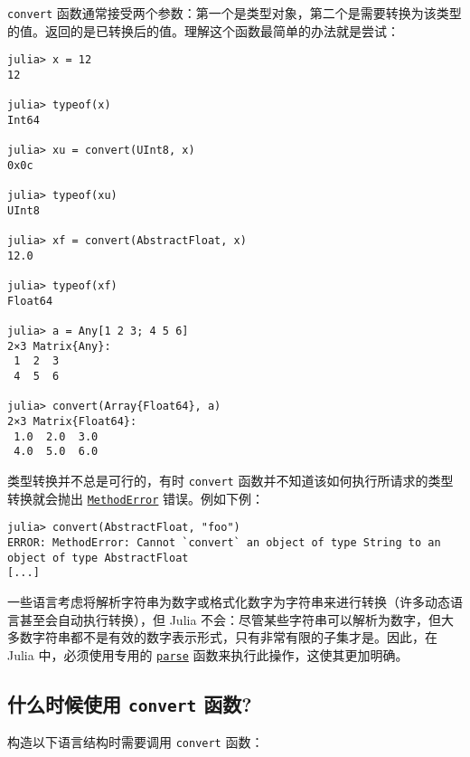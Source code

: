 \texttt{convert} 函数通常接受两个参数：第一个是类型对象，第二个是需要转换为该类型的值。返回的是已转换后的值。理解这个函数最简单的办法就是尝试：




\begin{verbatim}
julia> x = 12
12

julia> typeof(x)
Int64

julia> xu = convert(UInt8, x)
0x0c

julia> typeof(xu)
UInt8

julia> xf = convert(AbstractFloat, x)
12.0

julia> typeof(xf)
Float64

julia> a = Any[1 2 3; 4 5 6]
2×3 Matrix{Any}:
 1  2  3
 4  5  6

julia> convert(Array{Float64}, a)
2×3 Matrix{Float64}:
 1.0  2.0  3.0
 4.0  5.0  6.0
\end{verbatim}



类型转换并不总是可行的，有时 \texttt{convert} 函数并不知道该如何执行所请求的类型转换就会抛出 \hyperlink{68769522931907606}{\texttt{MethodError}} 错误。例如下例：




\begin{verbatim}
julia> convert(AbstractFloat, "foo")
ERROR: MethodError: Cannot `convert` an object of type String to an object of type AbstractFloat
[...]
\end{verbatim}



一些语言考虑将解析字符串为数字或格式化数字为字符串来进行转换（许多动态语言甚至会自动执行转换），但 Julia 不会：尽管某些字符串可以解析为数字，但大多数字符串都不是有效的数字表示形式，只有非常有限的子集才是。因此，在 Julia 中，必须使用专用的 \hyperlink{14207407853646164654}{\texttt{parse}} 函数来执行此操作，这使其更加明确。



\hypertarget{7039772400060801175}{}


\subsection{什么时候使用 \texttt{convert} 函数?}



构造以下语言结构时需要调用 \texttt{convert} 函数：



